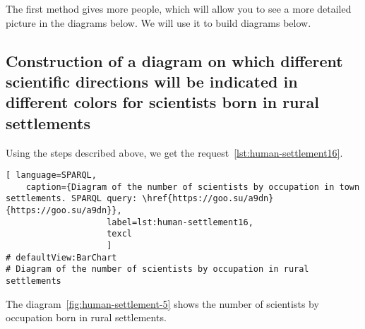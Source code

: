 The first method gives more people, which will allow you to see a more detailed picture in the diagrams below. We will use it to build diagrams below.

\subsection{Construction of a diagram on which different scientific directions will be indicated in different colors for scientists born in rural settlements}

Using the steps described above, we get the request~\protect\ref{lst:human-settlement16}.


\begin{lstlisting}[ language=SPARQL, 
    caption={Diagram of the number of scientists by occupation in town settlements. SPARQL query: \href{https://goo.su/a9dn}{https://goo.su/a9dn}},
                    label=lst:human-settlement16,
                    texcl 
                    ]
# defaultView:BarChart
# Diagram of the number of scientists by occupation in rural settlements

\end{lstlisting}%

The diagram~\ref{fig:human-settlement-5} shows the number of scientists by occupation
born in rural settlements.

\begin{figure*}
    \setlength{\fboxsep}{0pt}%
    \setlength{\fboxrule}{1pt}%
	\label{fig:human-settlement-5}
	\caption[Diagram of the number of scientists by occupation in rural settlements.]{Diagram of the number of scientists by occupation in rural settlements. SPARQL query: \href{https://goo.su/a9dn}{https://goo.su/a9dn}}%
\end{figure*} 

